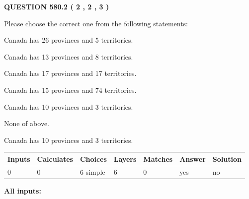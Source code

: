 \documentclass[12pt]{article}
\begin{document}
   
  
\vspace{0.2in}
  
{\textbf{\Large{QUESTION
580.2 
 ( 2 , 2 , 3 )
}}}
  
  
Please choose the correct one from the following statements:
 
 
Canada has  26 provinces and  5 territories.
 
 
Canada has  13 provinces and  8 territories.
 
 
Canada has  17 provinces and  17 territories.
 
 
Canada has  15 provinces and  74 territories.
 
 
Canada has 10  provinces and 3 territories.
 
 
 None of above.
 
 
\noindent{}
 
 
Canada has 10  provinces and 3 territories.
 
 
\noindent{}
 
 
   
   
   
   
\noindent\begin{tabular}{|l|l|l|l|l|l|l|}
 \hline
Inputs & Calculates & Choices & Layers & Matches & Answer & Solution \\ \hline
 0  & 
 0  & 
 6
  simple  
  & 
 6  & 
 0  & 
  yes & 
  no 
  \\ \hline
 \end{tabular}
   
   
   
   
\noindent{}
   
   
   
   
\noindent\vspace{0.1in}\hspace{-0.08in} {\textbf{\Large{All inputs: }}}
   
   
   
   
   
   
 \vspace{0.2in}
 
\end{document}
